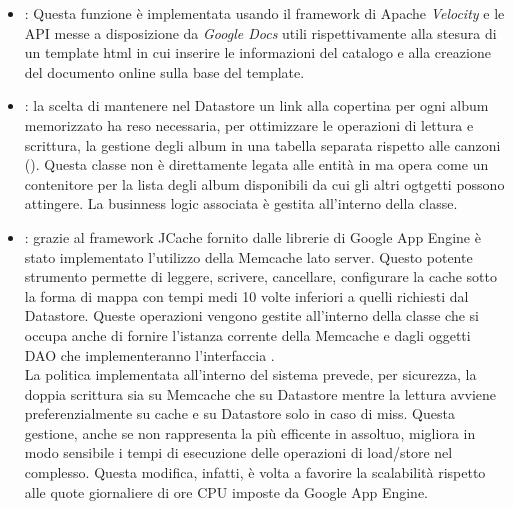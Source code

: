 \begin{itemize}
  \item {} : Questa funzione \`e implementata
  usando il framework di Apache \emph{Velocity} e le API messe a disposizione da
  \emph{Google Docs} utili rispettivamente alla stesura di un template html in
  cui inserire le informazioni del catalogo e alla creazione del
  documento online sulla base del template.
  
  \item {} : la scelta di mantenere nel
  Datastore un link alla copertina per ogni album memorizzato ha reso necessaria, per
  ottimizzare le operazioni di lettura e scrittura, la gestione degli album in
  una tabella separata rispetto alle canzoni (). Questa classe non \`e
  direttamente legata alle entit\`a in  ma opera come un contenitore
  per la lista degli album disponibili da cui gli altri ogtgetti possono
  attingere. La businness logic associata \`e gestita all'interno della classe.
  
  \item {} : grazie al framework
  JCache fornito dalle librerie di Google App Engine \`e stato implementato
  l'utilizzo della Memcache lato server. Questo potente strumento permette di
  leggere, scrivere, cancellare, configurare la cache sotto la forma di mappa
  con tempi medi 10 volte inferiori a quelli richiesti dal Datastore. Queste
  operazioni vengono gestite all'interno della classe  che si
  occupa anche di fornire l'istanza corrente della Memcache e dagli oggetti DAO
  che implementeranno l'interfaccia . \\
  La politica implementata all'interno del sistema prevede, per sicurezza, la
  doppia scrittura sia su Memcache che su Datastore mentre la lettura avviene
  preferenzialmente su cache e su Datastore solo in caso di miss. Questa
  gestione, anche se non rappresenta la pi\`u efficente in assoltuo, migliora in
  modo sensibile i tempi di esecuzione delle operazioni di load/store nel
  complesso. Questa modifica, infatti, \`e volta a favorire la scalabilit\`a
  rispetto alle quote giornaliere di ore CPU imposte da Google App Engine.
\end{itemize}

\newpage
